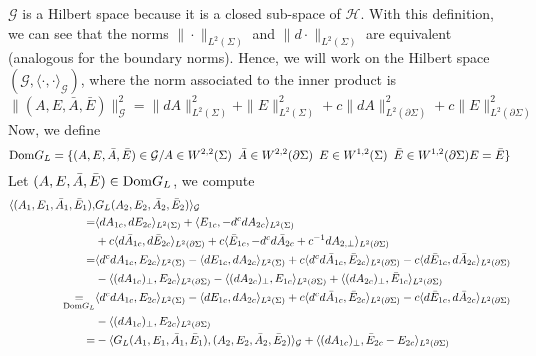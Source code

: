 $\mathcal{G}$ is a Hilbert space because it is a closed sub-space of $\mathcal{H}$. 
With this definition, we can see that the norms $\|\cdot\|_{L^2(\Sigma)}$ and $\|d\cdot\|_{L^2(\Sigma)}$ are equivalent (analogous for the boundary norms).
Hence, we will work on the Hilbert space $(\mathcal{G}, \langle\cdot , \cdot\rangle_{\mathcal{G}})$, where the norm associated to the inner product is
\begin{equation*}
\|(A,E,\bar{A},\bar{E})\|^2_{\mathcal{G}} = 
\| dA\|^2_{L^2(\Sigma)} + \|E\|^2_{L^2(\Sigma)} +c\| dA\|^2_{L^2(\partial \Sigma)} + c\|E\|^2_{L^2(\partial \Sigma)}
\end{equation*}
Now, we define
\begin{equation*}
\mathrm{Dom} G_L = \{ (A,E,\bar{A},\bar{E}) \in \mathcal{G} / A\in W^{2,2}(\Sigma) \enskip
\bar{A}\in W^{2,2}(\partial \Sigma) \enskip
E \in W^{1,2}(\Sigma) \enskip
\bar{E} \in W^{1,2}(\partial \Sigma)
E = \bar{E}\}
\end{equation*}
Let $(A,E,\bar{A},\bar{E}) \in \mathrm{Dom} G_L$, we compute
\begin{equation*}
\begin{split}
\langle (A_1,E_1,\bar{A}_1,\bar{E}_1), & G_L(A_2,E_2,\bar{A}_2,\bar{E}_2) \rangle_{\mathcal{G}} \\ =& 
\langle d A_{1c}, d E_{2c} \rangle_{L^2(\Sigma)} + \langle E_{1c}, -d^c dA_{2c}\rangle_{L^2(\Sigma)} \\
& + c \langle d\bar{A}_{1c}, d\bar{E}_{2c}\rangle_{L^2(\partial \Sigma)} 
+ c \langle \bar{E}_{1c}, -d^c d \bar{A}_{2c} + c^{-1}d A_{2,\bot} \rangle_{L^2(\partial \Sigma)} \\
%
= & \langle d^cdA_{1c}, E_{2c} \rangle_{L^2( \Sigma)} - \langle d E_{1c}, dA_{2c} \rangle_{L^2(\Sigma)}
+c \langle d^cd\bar{A}_{1c}, \bar{E}_{2c} \rangle_{L^2(\partial \Sigma)} - c \langle d \bar{E}_{1c}, d\bar{A}_{2c} \rangle_{L^2(\partial\Sigma)} \\
& -\langle (dA_{1c})_\bot , E_{2c} \rangle_{L^2(\partial \Sigma)} 
-\langle (dA_{2c})_\bot , {E}_{1c} \rangle_{L^2(\partial \Sigma)} 
+\langle (dA_{2c})_\bot , \bar{E}_{1c} \rangle_{L^2(\partial \Sigma)}  \\
%
\underset{\dom G_L}{=} &
\langle d^cdA_{1c}, E_{2c} \rangle_{L^2( \Sigma)} - \langle d E_{1c}, dA_{2c} \rangle_{L^2(\Sigma)}
+c \langle d^cd \bar{A}_{1c}, \bar{E}_{2c} \rangle_{L^2(\partial \Sigma)} - c \langle d \bar{E}_{1c}, d\bar{A}_{2c} \rangle_{L^2(\partial\Sigma)} \\
& -\langle (dA_{1c})_\bot , E_{2c} \rangle_{L^2(\partial \Sigma)} \\
%
= &
-\langle G_L(A_1,E_1,\bar{A}_1,\bar{E}_1), (A_2,E_2,\bar{A}_2,\bar{E}_2) \rangle_{\mathcal{G}} 
+ \langle (dA_{1c})_\bot , \bar{E}_{2c}-E_{2c} \rangle_{L^2(\partial \Sigma)} 
\end{split}
\end{equation*}
